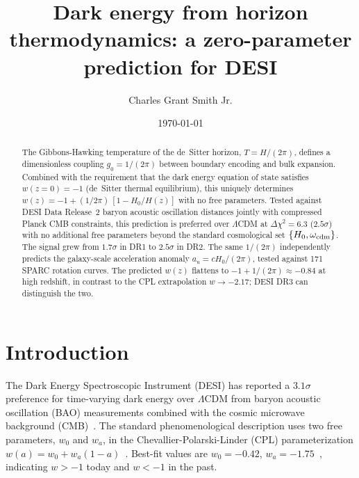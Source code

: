 \documentclass[aps,prl,twocolumn,showpacs,preprintnumbers,amsmath,amssymb,superscriptaddress]{revtex4-2}
\begin{document}
\title{Dark energy from horizon thermodynamics: a zero-parameter prediction for DESI}

\author{Charles Grant Smith Jr.}

\date{\today}

\begin{abstract}
The Gibbons-Hawking temperature of the de~Sitter horizon, $T = H/(2\pi)$, 
defines a dimensionless coupling $g_0 = 1/(2\pi)$ between boundary encoding 
and bulk expansion. Combined with the requirement that the dark energy 
equation of state satisfies $w(z{=}0) = -1$ (de~Sitter thermal equilibrium), 
this uniquely determines $w(z) = -1 + (1/2\pi)\,[1 - H_0/H(z)]$ with no 
free parameters. Tested against DESI Data Release~2 baryon acoustic 
oscillation distances jointly with compressed Planck CMB constraints, this 
prediction is preferred over $\Lambda$CDM at $\Delta\chi^2 = 6.3$ ($2.5\sigma$) 
with no additional free parameters beyond the standard cosmological set 
$\{H_0, \omega_{\rm cdm}\}$. The signal grew from $1.7\sigma$ in DR1 to 
$2.5\sigma$ in DR2. The same $1/(2\pi)$ independently predicts the galaxy-scale 
acceleration anomaly $a_u = cH_0/(2\pi)$, tested against 171 SPARC rotation 
curves. The predicted $w(z)$ flattens to $-1 + 1/(2\pi) \approx -0.84$ at 
high redshift, in contrast to the CPL extrapolation $w \to -2.17$; DESI DR3 
can distinguish the two.
\end{abstract}

\maketitle

\section{Introduction}

The Dark Energy Spectroscopic Instrument (DESI) has reported a 
$3.1\sigma$ preference for time-varying dark energy over $\Lambda$CDM 
from baryon acoustic oscillation (BAO) measurements combined with the 
cosmic microwave background (CMB)~\cite{DESI_DR2}. The standard 
phenomenological description uses two free parameters, $w_0$ and $w_a$, 
in the Chevallier-Polarski-Linder (CPL) parameterization 
$w(a) = w_0 + w_a(1-a)$~\cite{Chevallier2001,Linder2003}. Best-fit 
values are $w_0 = -0.42$, $w_a = -1.75$~\cite{DESI_DR2}, indicating 
$w > -1$ today and $w < -1$ in the past.
\end{document}

